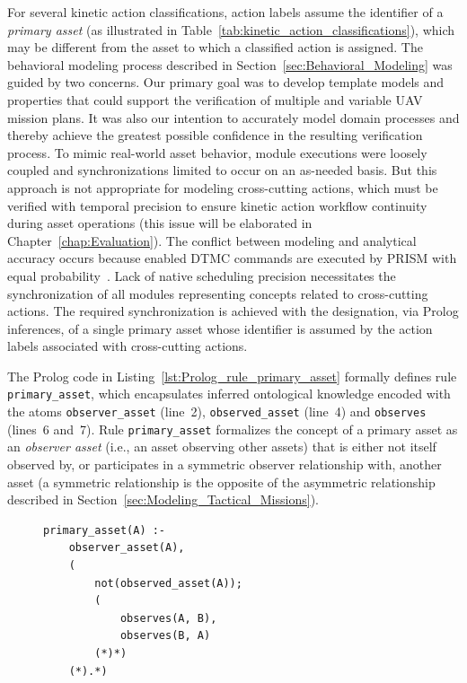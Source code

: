 For several kinetic action classifications, action labels assume the identifier of a \emph{primary asset} (as illustrated in Table~\ref{tab:kinetic_action_classifications}), which may be different from the asset to which a classified action is assigned. The behavioral modeling process described in Section~\ref{sec:Behavioral_Modeling} was guided by two concerns. Our primary goal was to develop template models and properties that could support the verification of multiple and variable UAV mission plans. It was also our intention to accurately model domain processes and thereby achieve the greatest possible confidence in the resulting verification process. To mimic real-world asset behavior, module executions were loosely coupled and synchronizations limited to occur on an as-needed basis. But this approach is not appropriate for modeling cross-cutting actions, which must be verified with temporal precision to ensure kinetic action workflow continuity during asset operations (this issue will be elaborated in Chapter~\ref{chap:Evaluation}). The conflict between modeling and analytical accuracy occurs because enabled DTMC commands are executed by PRISM with equal probability~\cite{PRISM_2010}. Lack of native scheduling precision necessitates the synchronization of all modules representing concepts related to cross-cutting actions. The required synchronization is achieved with the designation, via Prolog inferences, of a single primary asset whose identifier is assumed by the action labels associated with cross-cutting actions.

The Prolog code in Listing~\ref{lst:Prolog_rule_primary_asset} formally defines rule \texttt{primary\_asset}, which encapsulates inferred ontological knowledge encoded with the atoms \texttt{observer\_asset} (line~2), \texttt{observed\_asset} (line~4) and \texttt{observes} (lines~6 and~7). Rule \texttt{primary\_asset} formalizes the concept of a primary asset as an \emph{observer asset} (i.e., an asset observing other assets) that is either not itself observed by, or participates in a symmetric observer relationship with, another asset (a symmetric relationship is the opposite of the asymmetric relationship described in Section~\ref{sec:Modeling_Tactical_Missions}).

\begin{figure}[ht]
\begin{lstlisting}[caption={Prolog code for rule \texttt{primary\_asset}},label=lst:Prolog_rule_primary_asset]
primary_asset(A) :-
    observer_asset(A),
    (
        not(observed_asset(A));
        (
            observes(A, B),
            observes(B, A)
        (*)*)
    (*).*)
\end{lstlisting}
\end{figure}

